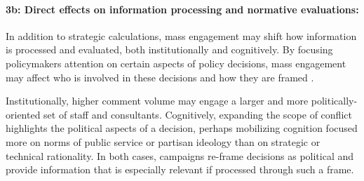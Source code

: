 \paragraph{3b: Direct effects on information processing and normative evaluations:}
In addition to strategic calculations, mass engagement may shift how information is processed and evaluated, both institutionally and cognitively. %
By focusing policymakers attention on certain aspects of policy decisions, mass engagement may affect who is involved in these decisions and how they are framed \citep{Rinfret2011}.

Institutionally, higher comment volume may engage a larger and more politically-oriented set of staff and consultants. Cognitively, expanding the scope of conflict highlights the political aspects of a decision, perhaps mobilizing cognition focused more on norms of public service or partisan ideology than on strategic or technical rationality. In both cases, campaigns re-frame decisions as political and provide information that is especially relevant if processed through such a frame.



